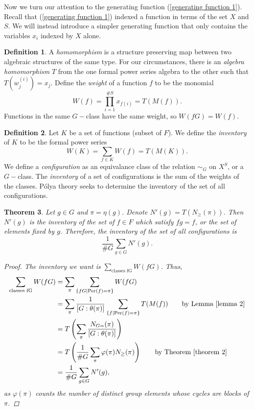 \documentclass[psamsfonts]{amsart}
\newtheorem{thm}{Theorem}[section]
\theoremstyle{definition}
\newtheorem{defn}[thm]{Definition}
\theoremstyle{remark}
\numberwithin{equation}{section}
\begin{document}
\indent Now we turn our attention to the generating function (\ref{generating function 1}). Recall that (\ref{generating function 1}) indexed a function in terms of the set $X$ and $S$. We will instead introduce a simpler generating function that only contains the variables $x_i$ indexed by $X$ alone.
\begin{defn}
A \textit{homomorphism} is a structure preserving map between two algebraic structures of the same type. For our circumstances, there is an \textit{algebra homomorphism} $T$ from the one formal power series algebra to the other such that $T(w_j^{(i)})=x_j$. Define the \textit{weight} of a function $f$ to be the monomial
\begin{equation}
    W(f)=\prod^{\#S}_{i=1}x_{f(i)}=T(M(f)).
\end{equation}
Functions in the same $G-$class have the same weight, so $W(fG)=W(f)$.
\end{defn}

\begin{defn}
Let $K$ be a set of functions (subset of $F$). We define the \textit{inventory} of $K$ to be the formal power series
\begin{equation*}
    W(K)=\sum_{f\in K}W(f)=T(M(K)).
\end{equation*}
We define a \textit{configuration} as an equivalance class of the relation $\sim_G$ on $X^{S}$, or a $G-$class. The \textit{inventory} of a set of configurations is the sum of the weights of the classes. P\'{o}lya theory seeks to determine the inventory of the set of all configurations.
\end{defn}

\begin{thm}\label{theorem 3}
Let $g\in G$ and $\pi=\eta(g)$. Denote $N'(g)=T(N_{\geq}(\pi))$. Then $N'(g)$ is the inventory of the set of $f\in F$ which satisfy $fg=f$, or the set of elements fixed by $g$. Therefore, the inventory of the set of all configurations is 
\begin{equation}
    \frac{1}{\#G}\sum_{g\in G}N'(g).
\end{equation}
\begin{proof}
The inventory we want is $\displaystyle\sum_{\text{classes fG}} W(fG)$. Thus,
\begin{equation*} 
\begin{split}
\sum_{\text{classes fG}} W(fG) & = \sum_{\pi}\sum_{\{fG\mid \text{Per}(f) = \pi\}} W(fG)\\
& = \sum_{\pi} \frac{1}{[G:\theta(\pi)]}\sum_{\{f\mid \text{Per}(f)=\pi\}}T(M(f)) \text{\qquad by Lemma \ref{lemma 2}}\\
& = T\left(\sum_{\pi} \frac{N_{G=}(\pi)}{[G:\theta(\pi)]} \right)\\
& = T\left(\frac{1}{\#G}\sum_{\pi}\varphi(\pi)N_{\geq}(\pi) \right) \text{\qquad by Theorem \ref{theorem 2}}\\
& = \frac{1}{\#G}\sum_{g\in G}N'(g),
\end{split}
\end{equation*}
as $\varphi(\pi)$ counts the number of distinct group elements whose cycles are blocks of $\pi$. 
\end{proof}
\end{thm}
\end{document}
